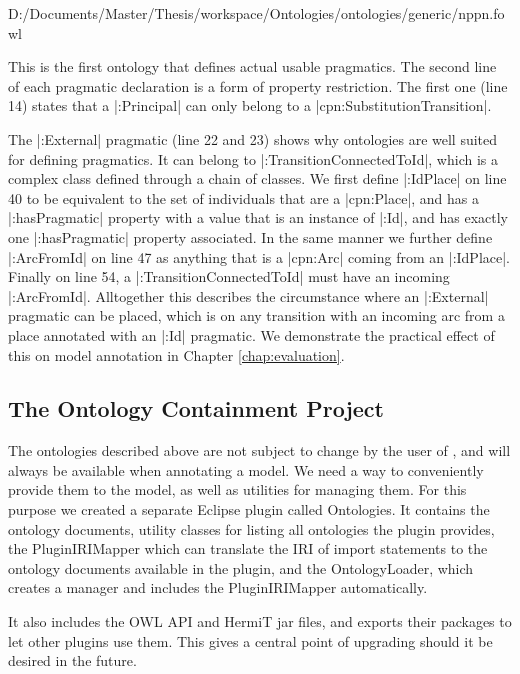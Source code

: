 
{D:/Documents/Master/Thesis/workspace/Ontologies/ontologies/generic/nppn.fowl}

This is the first ontology that defines actual usable pragmatics. The second
line of each pragmatic declaration is a form of property restriction. The first
one (line 14) states that a |:Principal| can only belong to a
|cpn:SubstitutionTransition|.

The |:External| pragmatic (line 22 and 23) shows why ontologies are well suited
for defining pragmatics. It can belong to |:TransitionConnectedToId|, which is a
complex class defined through a chain of classes. We first define |:IdPlace| on
line 40 to be equivalent to the set of individuals that are a |cpn:Place|, and
has a |:hasPragmatic| property with a value that is an instance of |:Id|, and
has exactly one |:hasPragmatic| property associated. In the same manner we
further define |:ArcFromId| on line 47 as anything that is a |cpn:Arc| coming
from an |:IdPlace|. Finally on line 54, a |:TransitionConnectedToId| must have
an incoming |:ArcFromId|. Alltogether this describes the circumstance where an
|:External| pragmatic can be placed, which is on any transition with an incoming
arc from a place annotated with an |:Id| pragmatic. We demonstrate the practical
effect of this on model annotation in Chapter \ref{chap:evaluation}.


\subsection{The Ontology Containment Project}
The ontologies described above are not subject to change by the user of \thename{},
and will always be available when annotating a model. We need a way to
conveniently provide them to the model, as well as utilities for managing them. For this purpose we
created a separate Eclipse plugin called Ontologies. It contains the ontology
documents, utility classes for listing all ontologies the plugin provides, the
PluginIRIMapper which can translate the IRI of import statements to the ontology
documents available in the plugin, and the OntologyLoader, which creates a
manager and includes the PluginIRIMapper automatically.

It also includes the OWL API and HermiT jar files, and exports their packages to
let other plugins use them. This gives a central point of upgrading should it be
desired in the future.

